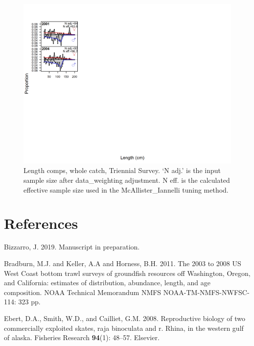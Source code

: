 \documentclass[12pt,]{article}
\begin{document}
\begin{figure}
\centering
\includegraphics{./r4ss/plots_mod1/comp_lenfit_flt6mkt0.png}
\caption{Length comps, whole catch, Triennial Survey. `N adj.' is the
input sample size after data\_weighting adjustment. N eff. is the
calculated effective sample size used in the McAllister\_Iannelli tuning
method. \label{fig:mod1_4_comp_lenfit_flt6mkt0}}
\end{figure}

\newpage

\color{black}

\hypertarget{references}{%
\section*{References}\label{references}}

\renewcommand{\thepage}{}

\hypertarget{refs}{}
\leavevmode\hypertarget{ref-Bizzarro2019}{}%
Bizzarro, J. 2019. Manuscript in preparation.

\leavevmode\hypertarget{ref-Bradburn2011}{}%
Bradburn, M.J. and Keller, A.A and Horness, B.H. 2011. The 2003 to 2008
US West Coast bottom trawl surveys of groundfish resources off
Washington, Oregon, and California: estimates of distribution,
abundance, length, and age composition. NOAA Technical Memorandum NMFS
NOAA-TM-NMFS-NWFSC-114: 323 pp.

\leavevmode\hypertarget{ref-Ebert2008}{}%
Ebert, D.A., Smith, W.D., and Cailliet, G.M. 2008. Reproductive biology
of two commercially exploited skates, raja binoculata and r. Rhina, in
the western gulf of alaska. Fisheries Research \textbf{94}(1): 48--57.
Elsevier.
\end{document}
